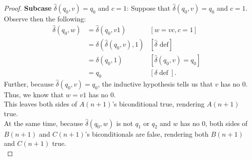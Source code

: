 \documentclass[10pt]{article}
\begin{document}
\begin{enumerate}[label={}]
\begin{proof}
              \textbf{Subcase }$\hat{\delta}\left(q_0, v\right)=q_0$ and $c=1$: Suppose that $\hat{\delta}\left(q_0, v\right)=q_0$ and $c=1$. Observe then the following:
              $$
                  \begin{aligned}
                      \hat{\delta}\left(q_0, w\right) & =\hat{\delta}\left(q_0, v 1\right)                     & {[w=v c, c=1] }                                     \\
                                                      & =\delta\left(\hat{\delta}\left(q_0, v\right), 1\right) & {[\hat{\delta} \text { def}] }                      \\
                                                      & =\delta\left(q_0, 1\right)                             & {\left[\hat{\delta}\left(q_0, v\right)=q_0\right] } \\
                                                      & =q_0                                                   & {[\delta \operatorname{def}] . }
                  \end{aligned}
              $$
              Further, because $\hat{\delta}\left(q_0, v\right)=q_0$, the inductive hypothesis tells us that $v$ has no 0. Thus, we know that $w=v1$ has no 0.\\
              This leaves both sides of $A(n+1)$'s biconditional true, rendering $A(n+1)$ true.\\
              At the same time, because $\hat{\delta}\left(q_0, w\right)$ is not $q_1$ or $q_2$ and $w$ has no 0, both sides of $B(n+1)$ and $C(n+1)$'s biconditionals are false, rendering both $B(n+1)$ and $C(n+1)$ true.\\


\end{proof}
\end{enumerate}
\end{document}
